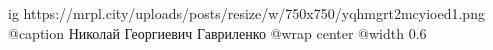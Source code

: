  
 
 
 
 

\ifcmt
  ig https://mrpl.city/uploads/posts/resize/w/750x750/yqhmgrt2mcyioed1.png
	@caption Николай Георгиевич Гавриленко
  @wrap center
  @width 0.6
\fi
